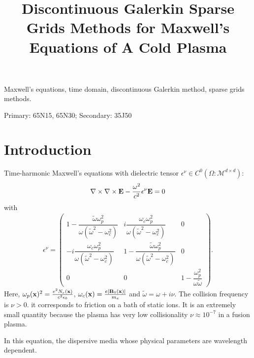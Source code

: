 \documentclass[final,leqno]{siamltex704}
\title{Discontinuous Galerkin Sparse Grids Methods for Maxwell's Equations of A Cold Plasma}
\author{
}
\def\bE{{\bf E}}
\begin{document}
\maketitle

\begin{abstract}
\end{abstract}

\begin{keywords}
Maxwell's equations, time domain, discontinuous Galerkin method, sparse grids methods.
\end{keywords}

\begin{AMS}
Primary: 65N15, 65N30; Secondary: 35J50
\end{AMS}
\pagestyle{myheadings}

\section{Introduction}
Time-harmonic Maxwell's equations with dielectric tensor $\epsilon^{\nu}\in C^0(\Omega : \mathcal{M}^{d\times d})$:
\begin{eqnarray}
\nabla\times\nabla\times{\bE}-\frac{\omega^2}{c^2}\epsilon^{\nu}\bE = 0
\end{eqnarray}
with
\begin{eqnarray*}
\epsilon^{\nu}=\begin{pmatrix}
1-\dfrac{\tilde{\omega}\omega_p^2}{\omega(\tilde{\omega}^2-\omega_c^2)}  & i\dfrac{\omega_c\omega_p^2}{\omega(\tilde{\omega}^2-\omega_c^2)} & 0\\
-i\dfrac{\omega_c\omega_p^2}{\omega(\tilde{\omega}^2-\omega_c^2)}& 1-\dfrac{\tilde{\omega}\omega_p^2}{\omega(\tilde{\omega}^2-\omega_c^2)} & 0\\
0 & 0 & 1-\dfrac{\omega_p^2}{\omega\tilde{\omega}}
\end{pmatrix}.
\end{eqnarray*}
Here, $\omega_p({\bf x})^2=\frac{e^2N_e({\bf x})}{c^2\epsilon_0}$, $\omega_c({\bf x})=\frac{e|{\bf B}_0({\bf x})|}{m_e}$ and $\tilde{\omega}=\omega+i\nu.$ The collision frequency is $\nu>0$. it corresponds to friction on a bath of static ions. It is an extremely small quantity because the plasma has very low collisionality $\nu\approx 10^{-7}$ in a fusion plasma.

In this equation, the dispersive media whose physical parameters are wavelength dependent.
\end{document}
